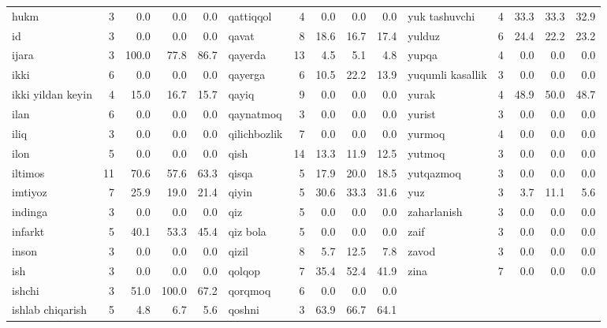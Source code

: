 \documentclass[a4paper,10pt]{article}
\begin{document}
\begin{longtable}{lrrrr|lrrrr|lrrrr}
hukm & 3 & 0.0 & 0.0 & 0.0 & qattiqqo\textquotesingle{}l & 4 & 0.0 & 0.0 & 0.0 & yuk tashuvchi & 4 & 33.3 & 33.3 & 32.9 \\
id & 3 & 0.0 & 0.0 & 0.0 & qavat & 8 & 18.6 & 16.7 & 17.4 & yulduz & 6 & 24.4 & 22.2 & 23.2 \\
ijara & 3 & 100.0 & 77.8 & 86.7 & qayerda & 13 & 4.5 & 5.1 & 4.8 & yupqa & 4 & 0.0 & 0.0 & 0.0 \\
ikki & 6 & 0.0 & 0.0 & 0.0 & qayerga & 6 & 10.5 & 22.2 & 13.9 & yuqumli kasallik & 3 & 0.0 & 0.0 & 0.0 \\
ikki yildan keyin & 4 & 15.0 & 16.7 & 15.7 & qayiq & 9 & 0.0 & 0.0 & 0.0 & yurak & 4 & 48.9 & 50.0 & 48.7 \\
ilan & 6 & 0.0 & 0.0 & 0.0 & qaynatmoq & 3 & 0.0 & 0.0 & 0.0 & yurist & 3 & 0.0 & 0.0 & 0.0 \\
iliq & 3 & 0.0 & 0.0 & 0.0 & qilichbozlik & 7 & 0.0 & 0.0 & 0.0 & yurmoq & 4 & 0.0 & 0.0 & 0.0 \\
ilon & 5 & 0.0 & 0.0 & 0.0 & qish & 14 & 13.3 & 11.9 & 12.5 & yutmoq & 3 & 0.0 & 0.0 & 0.0 \\
iltimos & 11 & 70.6 & 57.6 & 63.3 & qisqa & 5 & 17.9 & 20.0 & 18.5 & yutqazmoq & 3 & 0.0 & 0.0 & 0.0 \\
imtiyoz & 7 & 25.9 & 19.0 & 21.4 & qiyin & 5 & 30.6 & 33.3 & 31.6 & yuz & 3 & 3.7 & 11.1 & 5.6 \\
indinga & 3 & 0.0 & 0.0 & 0.0 & qiz & 5 & 0.0 & 0.0 & 0.0 & zaharlanish & 3 & 0.0 & 0.0 & 0.0 \\
infarkt & 5 & 40.1 & 53.3 & 45.4 & qiz bola & 5 & 0.0 & 0.0 & 0.0 & zaif & 3 & 0.0 & 0.0 & 0.0 \\
inson & 3 & 0.0 & 0.0 & 0.0 & qizil & 8 & 5.7 & 12.5 & 7.8 & zavod & 3 & 0.0 & 0.0 & 0.0 \\
ish & 3 & 0.0 & 0.0 & 0.0 & qo\textquotesingle{}lqop & 7 & 35.4 & 52.4 & 41.9 & zina & 7 & 0.0 & 0.0 & 0.0 \\
ishchi & 3 & 51.0 & 100.0 & 67.2 & qo\textquotesingle{}rqmoq & 6 & 0.0 & 0.0 & 0.0 &  &  &  &  &  \\
ishlab chiqarish & 5 & 4.8 & 6.7 & 5.6 & qo\textquotesingle{}shni & 3 & 63.9 & 66.7 & 64.1 &  &  &  &  &  \\
\end{longtable}
\normalsize
\end{document}
